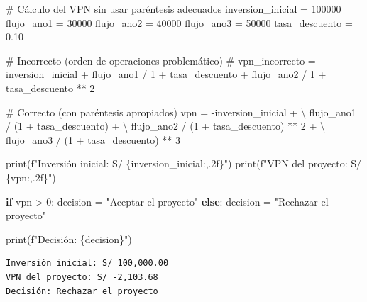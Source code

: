 \documentclass[
  doc,
  floatsintext,
  longtable,
  a4paper,
  nolmodern,
  notxfonts,
  notimes,
  12pt,
  colorlinks=true,linkcolor=blue,citecolor=blue,urlcolor=blue]{apa7}
\newenvironment{Shaded}{\begin{snugshade}}{\end{snugshade}}
\newcommand{\BuiltInTok}[1]{\textcolor[rgb]{0.00,0.23,0.31}{#1}}
\newcommand{\CommentTok}[1]{\textcolor[rgb]{0.37,0.37,0.37}{#1}}
\newcommand{\ControlFlowTok}[1]{\textcolor[rgb]{0.00,0.23,0.31}{\textbf{#1}}}
\newcommand{\DecValTok}[1]{\textcolor[rgb]{0.68,0.00,0.00}{#1}}
\newcommand{\FloatTok}[1]{\textcolor[rgb]{0.68,0.00,0.00}{#1}}
\newcommand{\NormalTok}[1]{\textcolor[rgb]{0.00,0.23,0.31}{#1}}
\newcommand{\OperatorTok}[1]{\textcolor[rgb]{0.37,0.37,0.37}{#1}}
\newcommand{\SpecialCharTok}[1]{\textcolor[rgb]{0.37,0.37,0.37}{#1}}
\newcommand{\SpecialStringTok}[1]{\textcolor[rgb]{0.13,0.47,0.30}{#1}}
\newcommand{\StringTok}[1]{\textcolor[rgb]{0.13,0.47,0.30}{#1}}
\begin{document}
\begin{Shaded}
\begin{Highlighting}[]
\CommentTok{\# Cálculo del VPN sin usar paréntesis adecuados}
\NormalTok{inversion\_inicial }\OperatorTok{=} \DecValTok{100000}
\NormalTok{flujo\_ano1 }\OperatorTok{=} \DecValTok{30000}
\NormalTok{flujo\_ano2 }\OperatorTok{=} \DecValTok{40000}
\NormalTok{flujo\_ano3 }\OperatorTok{=} \DecValTok{50000}
\NormalTok{tasa\_descuento }\OperatorTok{=} \FloatTok{0.10}

\CommentTok{\# Incorrecto (orden de operaciones problemático)}
\CommentTok{\# vpn\_incorrecto = {-}inversion\_inicial + flujo\_ano1 / 1 + tasa\_descuento + flujo\_ano2 / 1 + tasa\_descuento ** 2}

\CommentTok{\# Correcto (con paréntesis apropiados)}
\NormalTok{vpn }\OperatorTok{=} \OperatorTok{{-}}\NormalTok{inversion\_inicial }\OperatorTok{+} \OperatorTok{\textbackslash{}}
\NormalTok{      flujo\_ano1 }\OperatorTok{/}\NormalTok{ (}\DecValTok{1} \OperatorTok{+}\NormalTok{ tasa\_descuento) }\OperatorTok{+} \OperatorTok{\textbackslash{}}
\NormalTok{      flujo\_ano2 }\OperatorTok{/}\NormalTok{ (}\DecValTok{1} \OperatorTok{+}\NormalTok{ tasa\_descuento) }\OperatorTok{**} \DecValTok{2} \OperatorTok{+} \OperatorTok{\textbackslash{}}
\NormalTok{      flujo\_ano3 }\OperatorTok{/}\NormalTok{ (}\DecValTok{1} \OperatorTok{+}\NormalTok{ tasa\_descuento) }\OperatorTok{**} \DecValTok{3}

\BuiltInTok{print}\NormalTok{(}\SpecialStringTok{f"Inversión inicial: S/ }\SpecialCharTok{\{}\NormalTok{inversion\_inicial}\SpecialCharTok{:,.2f\}}\SpecialStringTok{"}\NormalTok{)}
\BuiltInTok{print}\NormalTok{(}\SpecialStringTok{f"VPN del proyecto: S/ }\SpecialCharTok{\{}\NormalTok{vpn}\SpecialCharTok{:,.2f\}}\SpecialStringTok{"}\NormalTok{)}

\ControlFlowTok{if}\NormalTok{ vpn }\OperatorTok{\textgreater{}} \DecValTok{0}\NormalTok{:}
\NormalTok{    decision }\OperatorTok{=} \StringTok{"Aceptar el proyecto"}
\ControlFlowTok{else}\NormalTok{:}
\NormalTok{    decision }\OperatorTok{=} \StringTok{"Rechazar el proyecto"}
    
\BuiltInTok{print}\NormalTok{(}\SpecialStringTok{f"Decisión: }\SpecialCharTok{\{}\NormalTok{decision}\SpecialCharTok{\}}\SpecialStringTok{"}\NormalTok{)}
\end{Highlighting}
\end{Shaded}

\begin{verbatim}
Inversión inicial: S/ 100,000.00
VPN del proyecto: S/ -2,103.68
Decisión: Rechazar el proyecto
\end{verbatim}
\end{document}
